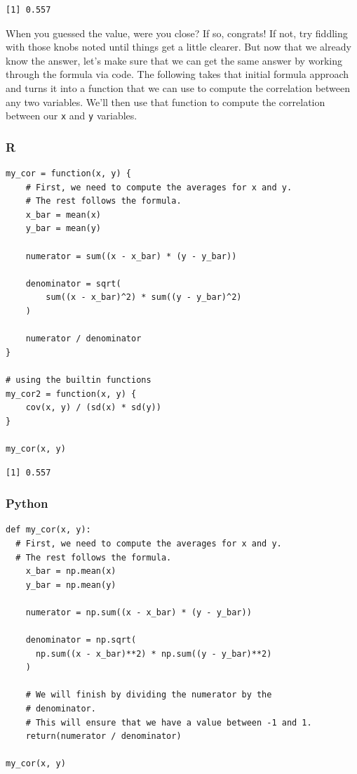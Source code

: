 \documentclass[
  letterpaper,
]{krantz}
\begin{document}
\begin{verbatim}
[1] 0.557
\end{verbatim}

When you guessed the value, were you close? If so, congrats! If not, try
fiddling with those knobs noted until things get a little clearer. But
now that we already know the answer, let's make sure that we can get the
same answer by working through the formula via code. The following takes
that initial formula approach and turns it into a function that we can
use to compute the correlation between any two variables. We'll then use
that function to compute the correlation between our \texttt{x} and
\texttt{y} variables.

\subsubsection{R}

\begin{verbatim}
my_cor = function(x, y) {
    # First, we need to compute the averages for x and y.
    # The rest follows the formula.
    x_bar = mean(x)
    y_bar = mean(y)

    numerator = sum((x - x_bar) * (y - y_bar))

    denominator = sqrt(
        sum((x - x_bar)^2) * sum((y - y_bar)^2)
    )

    numerator / denominator
}

# using the builtin functions
my_cor2 = function(x, y) {
    cov(x, y) / (sd(x) * sd(y))
}

my_cor(x, y)
\end{verbatim}

\begin{verbatim}
[1] 0.557
\end{verbatim}

\subsubsection{Python}

\begin{verbatim}
def my_cor(x, y):
  # First, we need to compute the averages for x and y.
  # The rest follows the formula.
    x_bar = np.mean(x)
    y_bar = np.mean(y)
    
    numerator = np.sum((x - x_bar) * (y - y_bar))
    
    denominator = np.sqrt(
      np.sum((x - x_bar)**2) * np.sum((y - y_bar)**2)
    )

    # We will finish by dividing the numerator by the 
    # denominator.
    # This will ensure that we have a value between -1 and 1.
    return(numerator / denominator)

my_cor(x, y)
\end{verbatim}
\end{document}
